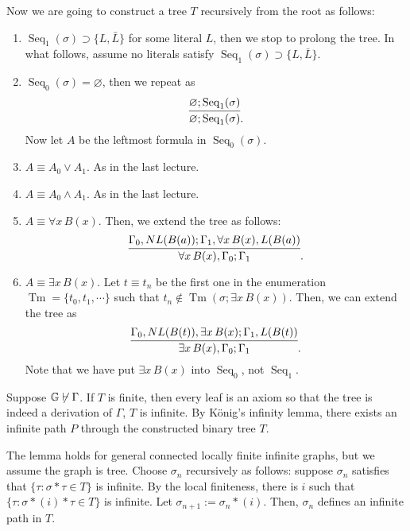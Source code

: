 \documentclass{../../small}
\DeclareMathOperator{\Tm}{Tm}
\DeclareMathOperator{\Seq}{Seq}
\begin{document}
Now we are going to construct a tree $T$ recursively from the root as follows:
\begin{enumerate}
\item
$\Seq_1(\sigma)\supset\{L,\bar{L}\}$ for some literal $L$, then we stop to prolong the tree.
In what follows, assume no literals satisfy $\Seq_1(\sigma)\supset\{L,\bar{L}\}$.

\item
$\Seq_0(\sigma)=\varnothing$, then we repeat as
\[\infer{\varnothing;\Seq_1(\sigma)}{\varnothing;\Seq_1(\sigma)}.\]
Now let $A$ be the leftmost formula in $\Seq_0(\sigma)$.

\item
$A\equiv A_0\vee A_1$.
As in the last lecture.

\item
$A\equiv A_0\wedge A_1$.
As in the last lecture.

\item
$A\equiv\forall x\,B(x)$.
Then, we extend the tree as follows:
\[\infer{\forall x\,B(x),\Gamma_0;\Gamma_1}{\Gamma_0,NL(B(a));\Gamma_1,\forall x\,B(x),L(B(a))}.\]

\item
$A\equiv\exists x\,B(x)$.
Let $t\equiv t_n$ be the first one in the enumeration $\Tm=\{t_0,t_1,\cdots\}$ such that $t_n\notin\Tm(\sigma;\exists x\,B(x))$.
Then, we can extend the tree as
\[\infer{\exists x\,B(x),\Gamma_0;\Gamma_1}{\Gamma_0,NL(B(t)),\exists x\,B(x);\Gamma_1,L(B(t))}.\]
Note that we have put $\exists x\,B(x)$ into $\Seq_0$, not $\Seq_1$.
\end{enumerate}

Suppose $\mathbb{G}\not\vdash\Gamma$.
If $T$ is finite, then every leaf is an axiom so that the tree is indeed a derivation of $\Gamma$, $T$ is infinite.
By K\"onig's infinity lemma, there exists an infinite path $P$ through the constructed binary tree $T$.

\begin{pf}
The lemma holds for general connected locally finite infinite graphs, but we assume the graph is tree.
Choose $\sigma_n$ recursively as follows: suppose $\sigma_n$ satisfies that $\{\tau:\sigma*\tau\in T\}$ is infinite.
By the local finiteness, there is $i$ such that $\{\tau:\sigma*(i)*\tau\in T\}$ is infinite.
Let $\sigma_{n+1}:=\sigma_n*(i)$.
Then, $\sigma_n$ defines an infinite path in $T$.
\end{pf}
\end{document}
